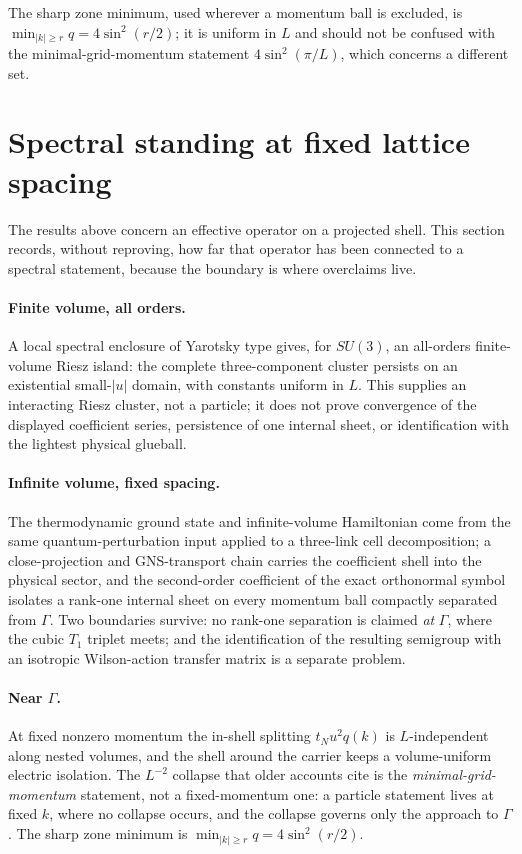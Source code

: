 \documentclass[11pt]{article}
\theoremstyle{definition}
\theoremstyle{remark}
\newcommand{\chk}[1]{}
\begin{document}
The sharp zone minimum, used wherever a momentum ball is excluded, is
$\min_{|k|\ge r}q=4\sin^2(r/2)$; it is uniform in $L$ and should not be
confused with the minimal-grid-momentum statement $4\sin^2(\pi/L)$, which
concerns a different set.\chk{the exact zone minimum of q on |k| >= r is 4 sin\^{}2(r/2), and Jordan overstates it by pi/2}

\section{Spectral standing at fixed lattice spacing}\label{sec:spectral}

The results above concern an effective operator on a projected shell. This
section records, without reproving, how far that operator has been connected to
a spectral statement, because the boundary is where overclaims live.

\paragraph{Finite volume, all orders.} A local spectral enclosure of Yarotsky
type gives, for $SU(3)$, an all-orders finite-volume Riesz island: the complete
three-component cluster persists on an existential small-$|u|$ domain, with
constants uniform in $L$. This supplies an interacting Riesz cluster, not a
particle; it does not prove convergence of the displayed coefficient series,
persistence of one internal sheet, or identification with the lightest physical
glueball.

\paragraph{Infinite volume, fixed spacing.} The thermodynamic ground state and
infinite-volume Hamiltonian come from the same quantum-perturbation input
applied to a three-link cell decomposition; a close-projection and GNS-transport
chain carries the coefficient shell into the physical sector, and the
second-order coefficient of the exact orthonormal symbol isolates a rank-one
internal sheet on every momentum ball compactly separated from $\Gamma$. Two
boundaries survive: no rank-one separation is claimed \emph{at} $\Gamma$, where
the cubic $T_1$ triplet meets; and the identification of the resulting
semigroup with an isotropic Wilson-action transfer matrix is a separate
problem.

\paragraph{Near $\Gamma$.} At fixed nonzero momentum the in-shell splitting
$t_Nu^2q(k)$ is $L$-independent along nested volumes, and the shell around the
carrier keeps a volume-uniform electric isolation. The $L^{-2}$ collapse that
older accounts cite is the \emph{minimal-grid-momentum} statement, not a
fixed-momentum one: a particle statement lives at fixed $k$, where no collapse
occurs, and the collapse governs only the approach to $\Gamma$. The sharp zone
minimum is $\min_{|k|\ge r}q=4\sin^2(r/2)$.
\end{document}
